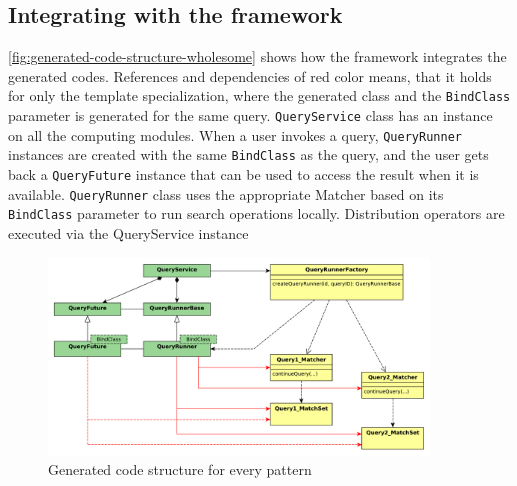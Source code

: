 \subsection{Integrating with the framework}

\autoref{fig:generated-code-structure-wholesome} shows how the framework integrates the generated codes. References and dependencies of red color means, that it holds for only the template specialization, where the generated class and the \texttt{BindClass} parameter is generated for the same query. \texttt{QueryService} class has an instance on all the computing modules. When a user invokes a query, \texttt{QueryRunner} instances are created with the same \texttt{BindClass} as the query, and the user gets back a \texttt{QueryFuture} instance that can be used to access the result when it is available. 
\texttt{QueryRunner} class uses the appropriate Matcher based on its \texttt{BindClass} parameter to run search operations locally. Distribution operators are executed via the QueryService instance

\begin{figure}[h]
	\begin{center}
		\includegraphics[width=0.9\textwidth]{figures/generated-code-structure-wholesome.pdf}
		\caption{Generated code structure for every pattern}
		\label{fig:generated-code-structure-wholesome}
	\end{center}
\end{figure}

















